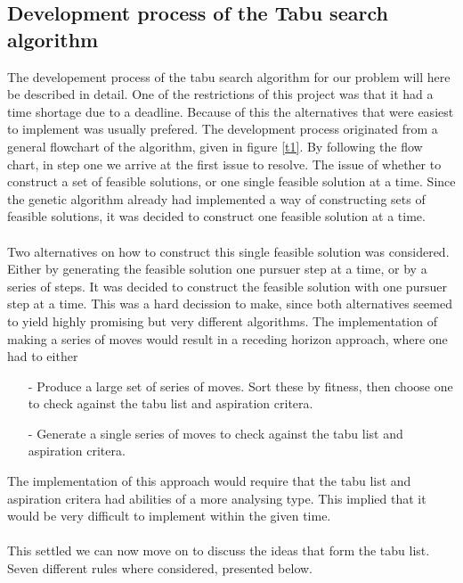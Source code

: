 \subsection{Development process of the Tabu search algorithm}
The developement process of the tabu search algorithm for our problem will here be described in detail. One of the restrictions of this project was that it had a time shortage due to a deadline. Because of this the alternatives that were easiest to implement was usually prefered. The development process originated from a general flowchart of the algorithm, given in figure \ref{t1}. By following the flow chart, in step one we arrive at the first issue to resolve. The issue of whether to construct a set of feasible solutions, or one single feasible solution at a time. Since the genetic algorithm already had implemented a way of constructing sets of feasible solutions, it was decided to construct one feasible solution at a time.\\
\\
Two alternatives on how to construct this single feasible solution was considered. Either by generating the feasible solution one pursuer step at a time, or by a series of steps. It was decided to construct the feasible solution with one pursuer step at a time. This was a hard decission to make, since both alternatives seemed to yield highly promising but very different algorithms. The implementation of making a series of moves would result in a receding horizon approach, where one had to either  
\begin{itemize}
\item[-]{}Produce a large set of series of moves. Sort these by fitness, then choose one to check against the tabu list and aspiration critera.
\item[-]{}Generate a single series of moves to check against the tabu list and aspiration critera.
\end{itemize}
The implementation of this approach would require that the tabu list and aspiration critera had abilities of a more analysing type. This implied that it would be very difficult to implement within the given time.\\
\\This settled we can now move on to discuss the ideas that form the tabu list. Seven different rules where considered, presented below.
